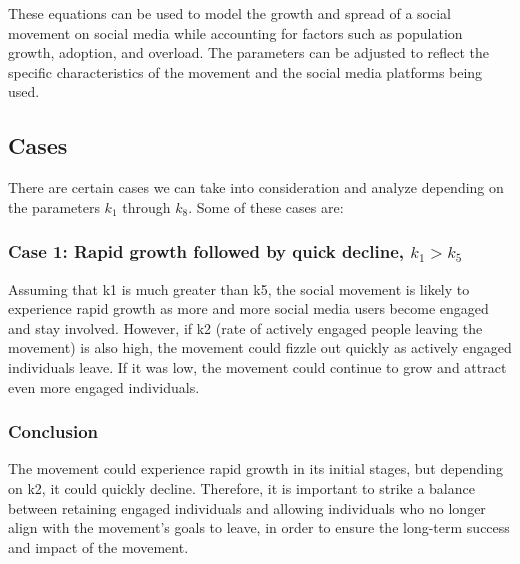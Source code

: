 \documentclass{article}
\begin{document}
	These equations can be used to model the growth and spread of a social movement on social media while accounting for factors such as population growth, adoption, and overload. The parameters can be adjusted to reflect the specific characteristics of the movement and the social media platforms being used.
 

    \subsection{Cases}
    
    There are certain cases we can take into consideration and analyze depending on the parameters $k_1$ through $k_8$. Some of these cases are: 


    \subsubsection*{Case 1: Rapid growth followed by quick decline, $k_1 > k_5$} \normalfont
    \begin{tcolorbox}
    Assuming that k1  is much greater than k5, the social movement is likely to experience rapid growth as more and more social media users become engaged and stay involved. However, if k2 (rate of actively engaged people leaving the movement) is also high, the movement could fizzle out quickly as actively engaged individuals leave. If it was low, the movement could continue to grow and attract even more engaged individuals.
    \subsubsection*{Conclusion}  The movement could experience rapid growth in its initial stages, but depending on k2, it could quickly decline. Therefore, it is important to strike a balance between retaining engaged individuals and allowing individuals who no longer align with the movement's goals to leave, in order to ensure the long-term success and impact of the movement.
    \end{tcolorbox}
\end{document}
